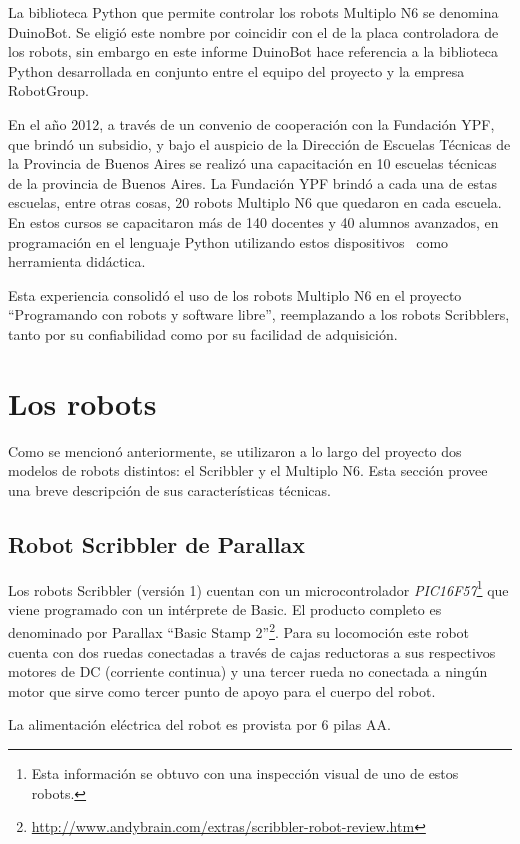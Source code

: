 La biblioteca Python que permite controlar los robots Multiplo N6 se
denomina DuinoBot. Se eligió este nombre por coincidir con el de la placa
controladora de los robots, sin embargo en este informe DuinoBot hace
referencia a la biblioteca Python desarrollada en conjunto
entre el equipo del proyecto \proyecto{} y la empresa RobotGroup.

En el año 2012, a través de un convenio de cooperación con la Fundación YPF,
que brindó
un subsidio, y bajo el auspicio de la Dirección de Escuelas Técnicas de la
Provincia de Buenos Aires se realizó una
capacitación en 10 escuelas técnicas de la
provincia de Buenos Aires. La Fundación YPF brindó a cada una de estas
escuelas, entre otras
cosas, 20 robots Multiplo N6 que quedaron en cada escuela. En estos cursos
se capacitaron más de 140 docentes y 40 alumnos avanzados, en programación
en el lenguaje Python utilizando
estos dispositivos~\citep{diaz_aprendiendo_2012} como herramienta didáctica.

Esta experiencia consolidó el uso de
los robots Multiplo N6 en el proyecto
``Programando con robots y software libre'', reemplazando
a los robots Scribblers, tanto por su confiabilidad como por su facilidad de
adquisición.

\section{Los robots}
Como se mencionó anteriormente, se utilizaron a lo largo del proyecto dos
modelos de robots distintos: el Scribbler y el Multiplo N6. Esta sección provee una
breve descripción de sus características técnicas.

\subsection{Robot Scribbler de Parallax}
Los robots Scribbler (versión 1) cuentan con un microcontrolador
\textit{PIC16F57}\footnote{Esta información se obtuvo con una inspección
visual de uno de estos robots.}
que viene programado con un intérprete de Basic. El producto
completo es denominado por Parallax
``Basic Stamp 2''\footnote{\url{http://www.andybrain.com/extras/scribbler-robot-review.htm}}.
Para su locomoción este robot cuenta con dos ruedas conectadas a través de
cajas
reductoras
a sus respectivos motores de DC (corriente continua)  y una tercer rueda no conectada a ningún
motor que sirve como tercer punto de apoyo para el cuerpo del robot.

La alimentación eléctrica del robot es provista por 6 pilas AA.

